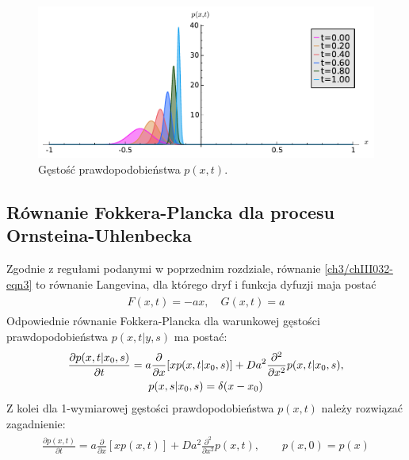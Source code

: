 \documentclass[a4paper,12pt,polish]{sphinxmanual}
\begin{document}
\begin{figure}[htbp]
\centering
\capstart

\includegraphics[width=0.800\linewidth]{sage_chIII031_01.pdf}
\caption{Gęstość prawdopodobieństwa $p(x,t)$.}\end{figure}


\subsection{Równanie Fokkera-Plancka dla procesu Ornsteina-Uhlenbecka}
\label{ch3/chIII032:rownanie-fokkera-plancka-dla-procesu-ornsteina-uhlenbecka}
Zgodnie z regułami podanymi w poprzednim rozdziale, równanie \eqref{ch3/chIII032-eqn3} to równanie Langevina, dla którego dryf i funkcja dyfuzji maja postać
\label{ch3/chIII032:equation-eqn18}\begin{gather}
\begin{split}F(x, t) = -ax, \quad G(x, t) = a\end{split}\label{ch3/chIII032-eqn18}
\end{gather}
Odpowiednie równanie Fokkera-Plancka dla warunkowej gęstości prawdopodobieństwa $p(x, t|y, s)$ ma postać:
\label{ch3/chIII032:equation-eqn19}\begin{gather}
\begin{split}\frac{\partial p(x, t|x_0, s)}{\partial t} = a \frac{\partial}{\partial x} [x p(x, t|x_0, s)] + D a^2 \frac{\partial^2}{\partial x^2} p(x,t|x_0,s),\end{split}\label{ch3/chIII032-eqn19}\\\begin{split}p(x, s|x_0, s) =\delta(x-x_0)\end{split}\notag
\end{gather}
Z kolei dla 1-wymiarowej gęstości prawdopodobieństwa $p(x, t)$ należy rozwiązać zagadnienie:
\label{ch3/chIII032:equation-eqn20}\begin{gather}
\begin{split}\frac{\partial p(x, t)}{\partial t} = a \frac{\partial}{\partial x} [x p(x, t)] + D a^2 \frac{\partial^2}{\partial x^2} p(x, t), \qquad p(x, 0) =p(x)\end{split}\label{ch3/chIII032-eqn20}
\end{gather}
\end{document}
